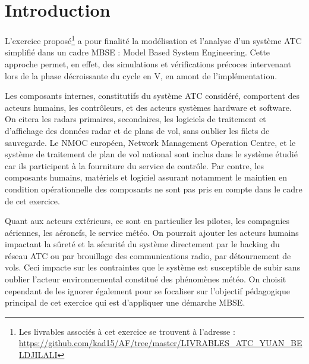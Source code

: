 
\pagebreak

\section*{Introduction}



L'exercice proposé\footnote{Les livrables associés à cet exercice se trouvent à l'adresse : 
	\url{https://github.com/kad15/AF/tree/master/LIVRABLES_ATC_YUAN_BELDJILALI}} a pour finalité la modélisation et l'analyse d'un système ATC simplifié dans un cadre MBSE : Model Based System Engineering. Cette approche permet, en effet, des simulations et vérifications précoces intervenant lors de la phase décroissante du cycle en V, en amont de l'implémentation.   




Les composants internes, constitutifs du système ATC considéré, comportent des acteurs humains, les contrôleurs, et des acteurs systèmes hardware et software. On citera les radars primaires, secondaires, les logiciels de traitement et d'affichage des données radar et de plans de vol, sans oublier les filets de sauvegarde. Le NMOC européen, Network Management Operation Centre, et le système de traitement de plan de vol national sont inclus dans le système étudié car ils participent à la fourniture du service de contrôle. Par contre, les composants humains, matériels et logiciel assurant notamment le maintien en condition opérationnelle des composants ne sont pas pris en compte dans le cadre de cet exercice.

Quant aux acteurs extérieurs, ce sont en particulier les pilotes, les compagnies aériennes, les aéronefs, le service météo. On pourrait ajouter les acteurs humains impactant la sûreté et la sécurité du système directement par le hacking du réseau ATC ou par brouillage des communications radio, par détournement de vols. Ceci impacte sur les contraintes que le système est susceptible de subir sans oublier l'acteur environnemental constitué des phénomènes météo. On choisit cependant de les ignorer également pour se focaliser sur l'objectif pédagogique principal de cet exercice qui est d'appliquer une démarche MBSE.







